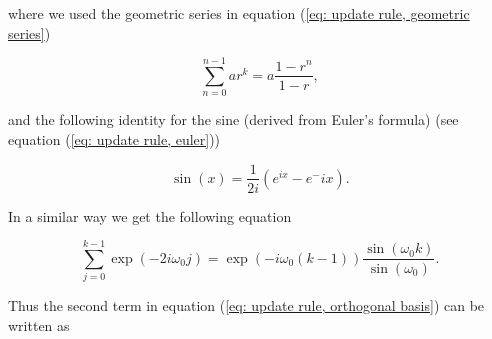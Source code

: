 \documentclass[11pt,a4paper,twoside]{report}
\begin{document}
where we used the geometric series in equation (\ref{eq: update rule, geometric series})

\begin{equation*}
	\sum_{n=0}^{n-1}ar^k = a\frac{1-r^n}{1-r},
\end{equation*}

and the following identity for the sine (derived from Euler's formula) (see equation (\ref{eq: update rule, euler}))

\begin{equation*}
	\sin{\left(x\right)} = \frac{1}{2i}\left(e^{ix} - e^-ix\right).
\end{equation*}

In a similar way we get the following equation

\begin{equation*}
	\sum_{j=0}^{k-1}\exp{\left(-2i\omega_0j\right)} = \exp{\left(-i\omega_0\left(k-1\right)\right)}\frac{\sin{\left(\omega_0k\right)}}{\sin{\left(\omega_0\right)}}.
\end{equation*}

Thus the second term in equation (\ref{eq: update rule, orthogonal basis}) can be written as
\end{document}
